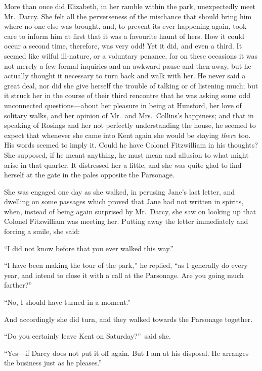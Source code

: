 \documentclass[12pt,english,oneside]{book}
\begin{document}
More than once did Elizabeth, in her ramble within the park, unexpectedly
meet Mr.\ Darcy. She felt all the perverseness of the mischance that
should bring him where no one else was brought, and, to prevent its
ever happening again, took care to inform him at first that it was
a favourite haunt of hers. How it could occur a second time, therefore,
was very odd! Yet it did, and even a third. It seemed like wilful
ill-nature, or a voluntary penance, for on these occasions it was
not merely a few formal inquiries and an awkward pause and then away,
but he actually thought it necessary to turn back and walk with her.
He never said a great deal, nor did she give herself the trouble of
talking or of listening much; but it struck her in the course of their
third rencontre that he was asking some odd unconnected questions\mbox{---}about
her pleasure in being at Hunsford, her love of solitary walks, and
her opinion of Mr.\ and Mrs.\ Collins's happiness; and that in speaking
of Rosings and her not perfectly understanding the house, he seemed
to expect that whenever she came into Kent again she would be staying
\textit{there} too. His words seemed to imply it. Could he have Colonel
Fitzwilliam in his thoughts? She supposed, if he meant anything, he
must mean and allusion to what might arise in that quarter. It distressed
her a little, and she was quite glad to find herself at the gate in
the pales opposite the Parsonage.

She was engaged one day as she walked, in perusing Jane's last letter,
and dwelling on some passages which proved that Jane had not written
in spirits, when, instead of being again surprised by Mr.\ Darcy,
she saw on looking up that Colonel Fitzwilliam was meeting her. Putting
away the letter immediately and forcing a smile, she said:

{}``I did not know before that you ever walked this way.''

{}``I have been making the tour of the park,'' he replied, {}``as
I generally do every year, and intend to close it with a call at the
Parsonage. Are you going much farther?''\ 

{}``No, I should have turned in a moment.''

And accordingly she did turn, and they walked towards the Parsonage
together.

{}``Do you certainly leave Kent on Saturday?''\ said she.

{}``Yes\mbox{---}if Darcy does not put it off again. But I am at
his disposal. He arranges the business just as he pleases.''
\end{document}
